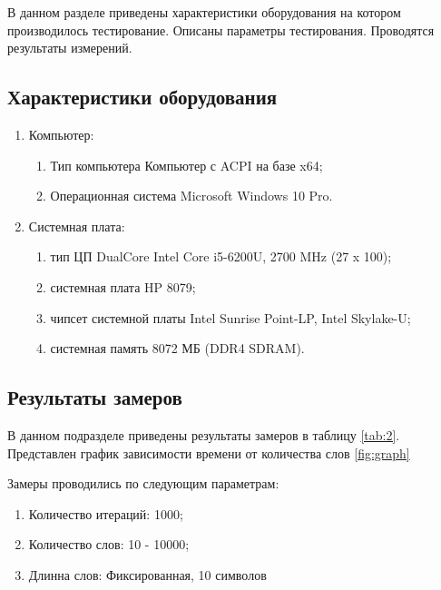 \documentclass[../main.tex]{subfiles}
\begin{document}
	
	В данном разделе приведены характеристики оборудования на котором производилось тестирование. 
	Описаны параметры тестирования. 
	Проводятся результаты измерений.
	
\subsection{Характеристики оборудования}

	\begin{enumerate}[1)]
		\item Компьютер:
		\begin{enumerate}
			\item Тип компьютера   Компьютер с ACPI на базе x64;
			\item Операционная система   Microsoft Windows 10 Pro.
		\end{enumerate}
		\item Системная плата:
		\begin{enumerate}
			\item тип ЦП   DualCore Intel Core i5-6200U, 2700 MHz (27 x 100);
			\item системная плата   HP 8079;
			\item чипсет системной платы   Intel Sunrise Point-LP, Intel Skylake-U;
			\item системная память   8072 МБ (DDR4 SDRAM).
		\end{enumerate}
	\end{enumerate}

\subsection{Результаты замеров}

	В данном подразделе приведены результаты замеров в таблицу \ref{tab:2}. Представлен график зависимости времени от количества слов \ref{fig:graph}
	
	Замеры проводились по следующим параметрам:
	
	\begin{enumerate}[1)]
		\item Количество итераций: 1000;
		\item Количество слов: 10 - 10000;
		\item Длинна слов: Фиксированная, 10 символов
	\end{enumerate}
\end{document}
